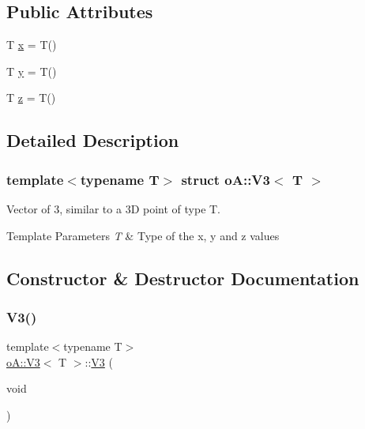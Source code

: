 \subsection*{Public Attributes}
\begin{DoxyCompactItemize}
\item 
T \mbox{\hyperlink{structo_a_1_1_v3_a2171113146a81277db6009a5c6af883f}{x}} = T()
\item 
T \mbox{\hyperlink{structo_a_1_1_v3_a04cf470d60a012fe0dc40a92c7ec9e73}{y}} = T()
\item 
T \mbox{\hyperlink{structo_a_1_1_v3_a30e27d6464ac2143637bfc675a1e5dd7}{z}} = T()
\end{DoxyCompactItemize}


\subsection{Detailed Description}
\subsubsection*{template$<$typename T$>$\newline
struct o\+A\+::\+V3$<$ T $>$}

Vector of 3, similar to a 3D point of type T. 


\begin{DoxyTemplParams}{Template Parameters}
{\em T} & Type of the x, y and z values \\
\hline
\end{DoxyTemplParams}


\subsection{Constructor \& Destructor Documentation}
\mbox{\label{structo_a_1_1_v3_af7d2e9a3d4eecae6bdd7adf7dd1a691b}} 
\subsubsection{\texorpdfstring{V3()}{V3()}\hspace{0.1cm}{\footnotesize\ttfamily [1/3]}}
{\footnotesize\ttfamily template$<$typename T$>$ \\
\mbox{\hyperlink{structo_a_1_1_v3}{o\+A\+::\+V3}}$<$ T $>$\+::\mbox{\hyperlink{structo_a_1_1_v3}{V3}} (\begin{DoxyParamCaption}\item[{void}]{ }\end{DoxyParamCaption})\hspace{0.3cm}{\ttfamily [default]}}



